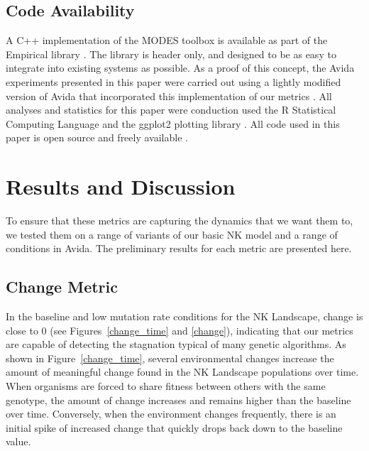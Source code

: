 \documentclass[letterpaper]{article}
\begin{document}
\subsection{Code Availability}
A C++ implementation of the MODES toolbox is available as part of the Empirical library \citep{charles_ofria_2018_1439475}. The library is header only, and designed to be as easy to integrate into existing systems as possible. As a proof of this concept, the Avida experiments presented in this paper were carried out using a lightly modified version of Avida that incorporated this implementation of our metrics \citep{david_bryson_2018_1439479}. All analyses and statistics for this paper were conduction used the R Statistical Computing Language \citep{r_core_team_r:_2017} and the ggplot2 plotting library \citep{wickham_ggplot2_2016}. All code used in this paper is open source and freely available \citep{emily_dolson_2018_1442906}.


\section{Results and Discussion}
To ensure that these metrics are capturing the dynamics that we want them to, we tested them on a range of variants of our basic NK model and a range of conditions in Avida. The preliminary results for each metric are presented here.

\subsection{Change Metric}
In the baseline and low mutation rate conditions for the NK Landscape, change is close to 0 (see Figures~\ref{change_time} and \ref{change}), indicating that our metrics are capable of detecting the stagnation typical of many genetic algorithms. As shown in Figure~\ref{change_time}, several environmental changes increase the amount of meaningful change found in the NK Landscape populations over time. When organisms are forced to share fitness between others with the same genotype, the amount of change increases and remains higher than the baseline over time. Conversely, when the environment changes frequently, there is an initial spike of increased change that quickly drops back down to the baseline value.
\end{document}
